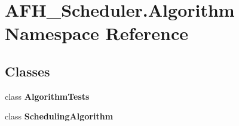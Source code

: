 \section{A\+F\+H\+\_\+\+Scheduler.\+Algorithm Namespace Reference}
\label{namespace_a_f_h___scheduler_1_1_algorithm}
\subsection*{Classes}
\begin{DoxyCompactItemize}
\item 
class \textbf{ Algorithm\+Tests}
\item 
class \textbf{ Scheduling\+Algorithm}
\end{DoxyCompactItemize}
